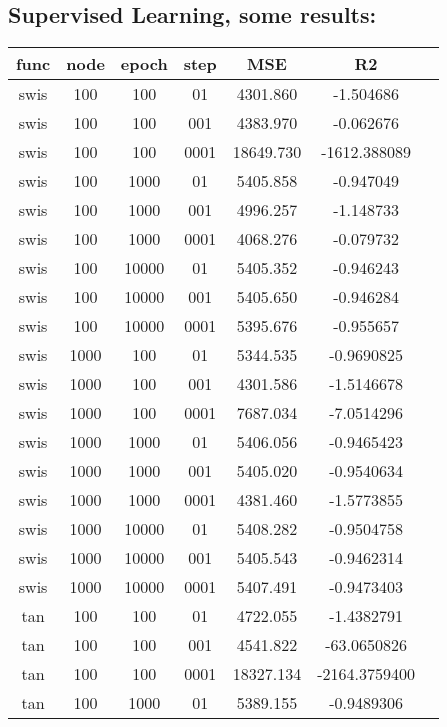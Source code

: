 \subsection{Supervised Learning, some results:}
\begin{tabular}{|c|c|c|c|c|c|c|} \hline
func	&	node	&	epoch	&	step	&		MSE		&	R2	\\ 
\hline
swis	&	100 	&	100 	& 	01 		&	4301.860	&	-1.504686		\\ 
\hline
swis	&	100 	&	100 	& 	001		&	4383.970	&	-0.062676		\\ 
\hline
swis	&	100 	&	100  	& 	0001	&	18649.730	&	-1612.388089		\\ 
\hline
swis	&	100 	&	1000 	& 	01		&	5405.858	&	-0.947049		\\ 
\hline
swis	&	100 	&	1000	& 	001		&	4996.257	&	-1.148733		\\ 
\hline
swis	&	100 	&	1000	& 	0001	&	4068.276	&	-0.079732		\\ 
\hline
swis	&	100 	&	10000	& 	01		&	 5405.352	&	 -0.946243		\\ 
\hline
swis	&	100 	&	10000	& 	001		&	 5405.650	&	 -0.946284		\\ 
\hline
swis	&	100 	&	10000	& 	0001 	&	5395.676 	& -0.955657		\\ 
\hline
swis	&	1000	&	 100	& 	01		&	 5344.535	&	 -0.9690825\\ 
\hline
swis	&	1000	&	 100	& 	001		&	 4301.586	&	 -1.5146678\\ 
\hline
swis	&	1000	&	 100	& 	0001	&	 7687.034	&	 -7.0514296\\ 
\hline
swis	&	1000	&	 1000	& 	01		&	 5406.056	&	 -0.9465423\\ 
\hline
swis	&	1000	&	 1000 	& 	001		&	 5405.020	&	 -0.9540634\\ 
\hline
swis	&	1000	&	 1000 	&	 0001	&	 4381.460	&	 -1.5773855\\ 
\hline
swis	&	1000	&	 10000 	&  	01		&	 5408.282	&	 -0.9504758\\ 
\hline
swis	&	1000	&	 10000 	&	 001	&	 5405.543	&	 -0.9462314\\ 
\hline
swis	&	1000	&	 10000 	&	 0001	&	 5407.491	&	 -0.9473403\\ 
\hline
tan 	& 100 		&   100   	& 	01		&	 4722.055 	&	-1.4382791	\\ 
\hline
tan 	& 100  		&	100   	& 	001		&	 4541.822 	&	-63.0650826	\\ 
\hline
tan 	& 100  		&	100   	& 	0001	&	 18327.134	&	 -2164.3759400 	\\ 
\hline
tan 	& 100  		&	1000  	& 	01		&	 5389.155 	&	-0.9489306     \\

\end{tabular}

